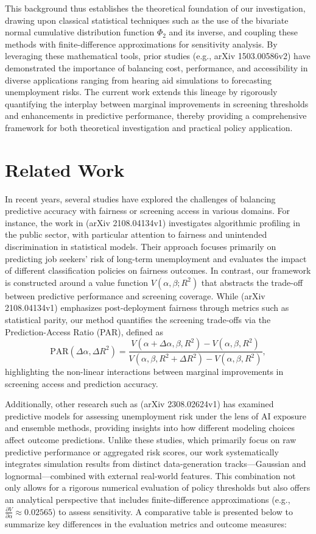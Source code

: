 \documentclass[11pt]{article}
\begin{document}
This background thus establishes the theoretical foundation of our investigation, drawing upon classical statistical techniques such as the use of the bivariate normal cumulative distribution function \(\Phi_2\) and its inverse, and coupling these methods with finite-difference approximations for sensitivity analysis. By leveraging these mathematical tools, prior studies (e.g., arXiv 1503.00586v2) have demonstrated the importance of balancing cost, performance, and accessibility in diverse applications ranging from hearing aid simulations to forecasting unemployment risks. The current work extends this lineage by rigorously quantifying the interplay between marginal improvements in screening thresholds and enhancements in predictive performance, thereby providing a comprehensive framework for both theoretical investigation and practical policy application.

\section{Related Work}
In recent years, several studies have explored the challenges of balancing predictive accuracy with fairness or screening access in various domains. For instance, the work in (arXiv 2108.04134v1) investigates algorithmic profiling in the public sector, with particular attention to fairness and unintended discrimination in statistical models. Their approach focuses primarily on predicting job seekers' risk of long-term unemployment and evaluates the impact of different classification policies on fairness outcomes. In contrast, our framework is constructed around a value function \(V(\alpha,\beta;R^2)\) that abstracts the trade-off between predictive performance and screening coverage. While (arXiv 2108.04134v1) emphasizes post-deployment fairness through metrics such as statistical parity, our method quantifies the screening trade-offs via the Prediction-Access Ratio (PAR), defined as 
\[
\text{PAR}(\Delta\alpha, \Delta R^2) = \frac{V(\alpha+\Delta\alpha,\beta,R^2)-V(\alpha,\beta,R^2)}{V(\alpha,\beta,R^2+\Delta R^2)-V(\alpha,\beta,R^2)},
\]
highlighting the non-linear interactions between marginal improvements in screening access and prediction accuracy.

Additionally, other research such as (arXiv 2308.02624v1) has examined predictive models for assessing unemployment risk under the lens of AI exposure and ensemble methods, providing insights into how different modeling choices affect outcome predictions. Unlike these studies, which primarily focus on raw predictive performance or aggregated risk scores, our work systematically integrates simulation results from distinct data-generation tracks—Gaussian and lognormal—combined with external real-world features. This combination not only allows for a rigorous numerical evaluation of policy thresholds but also offers an analytical perspective that includes finite-difference approximations (e.g., \(\frac{\partial V}{\partial\alpha}\approx0.02565\)) to assess sensitivity. A comparative table is presented below to summarize key differences in the evaluation metrics and outcome measures:
\end{document}
